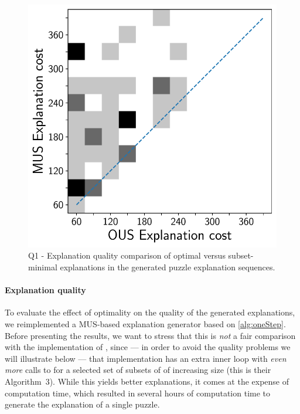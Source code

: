 \begin{figure}[t]
  \centering
  \includegraphics[width=0.6\columnwidth]{figures_post_paper/heatmap_costs_mus_cous.pdf}
  \caption{Q1 - Explanation quality comparison of optimal versus subset-minimal explanations in the generated puzzle explanation sequences.}
  \label{fig:rq1_heatmap}
\end{figure}


\paragraph{Explanation quality}\label{paragraph:explanationquality}
To evaluate the effect of optimality on the quality of the generated explanations, we reimplemented a MUS-based explanation generator based on \cref{alg:oneStep}. 
Before presenting the results, we want to stress that this is \emph{not} a fair comparison with the implementation of \citet{ecai/BogaertsGCG20}, since --- in order to avoid the quality problems we will illustrate below --- that implementation has an extra inner loop with \emph{even more} calls to  for a selected set of subsets of \formulac of increasing size (this is their Algorithm~3). 
While this yields better explanations, it comes at the expense of computation time, which resulted in several hours of computation time to generate the explanation of a single puzzle. 


